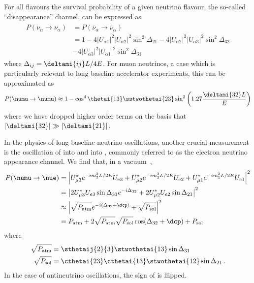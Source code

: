For all flavours the survival probability of a given neutrino flavour, the so-called ``disappearance'' channel, can be expressed as~\cite{Nunokawa_2008}
\begin{align}
\begin{split}
  P(\nu_{\alpha} \rightarrow \nu_{\alpha}) &= P(\overline{\nu}_{\alpha} \rightarrow \overline{\nu}_{\alpha})\\
  &= 1 - 4|U_{\alpha 1}|^{2} |U_{\alpha 2}|^{2} \sin^{2} \Delta_{21} - 4 |U_{\alpha 2}|^{2} |U_{\alpha 3}|^{2} \sin^{2}\Delta_{32} \\ &- 4 |U_{\alpha 3}|^{2} |U_{\alpha 1}|^{2} \sin^{2} \Delta_{31}
\end{split}
\end{align}
where $\Delta_{ij}=\deltami{ij}L/4E$.
For muon neutrinos, a case which is particularly relevant to long baseline accelerator experiments, this can be approximated as
\begin{align}
  P(\numu \rightarrow \numu) \approx 1 - \cos^{4}\thetai{13} \sstwothetai{23} \sin^{2} \left( 1.27 \frac{\deltami{32}L}{E} \right)
  \label{eq:numuSurvival}
\end{align}
where we have dropped higher order terms on the basis that $|\deltami{32}| \gg |\deltami{21}|$.

In the physics of long baseline neutrino oscillations, another crucial measurement is the oscillation of \numu into \nue and \anumu into \anue, commonly referred to as the electron neutrino appearance channel.
We find that, in a vacuum~\cite{Nunokawa_2008},
\begin{align}
\begin{split}
  P(\numu \rightarrow \nue) &= \left| U^{*}_{\mu 3} e^{-im_{3}^{2}L/2E} U_{e3} + U^{*}_{\mu 2} e^{-im_{2}^{2}L/2E} U_{e2} + U^{*}_{\mu 1}e^{-im_{1}^{2}L/2E}U_{e1} \right|^{2} \\
  &= \left| 2U_{\mu 3}^{*}U_{e3} \sin \Delta_{31} e^{-i \Delta_{32}} + 2U^{*}_{\mu 2}U_{e2} \sin \Delta_{21} \right|^{2} \\
  & \approx \left| \sqrt{P_{\text{atm}}} e^{-i(\Delta_{32}+\dcp)} + \sqrt{P_{\text{sol}}} \right|^{2} \\
  &= P_{\text{atm}} + 2 \sqrt{P_{\text{atm}}} \sqrt{P_{\text{sol}}} \cos(\Delta_{32}+\dcp) + P_{\text{sol}}
  \label{eq:threeNuApp}
\end{split}
\end{align}
where
\begin{align}
  \sqrt{P_{\text{atm}}} &= \sthetaij{2}{3} \stwothetai{13} \sin\Delta_{31} \\
  \sqrt{P_{\text{sol}}} &= \cthetai{23} \cthetai{13} \stwothetai{12} \sin\Delta_{21} \, .
\end{align}
In the case of antineutrino oscillations, the sign of \dcp is flipped.

